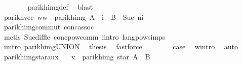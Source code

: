 \begin{isabellebody}
\ \ \ \ \ \ \isamarkupfalse%
\ parikh{\isacharunderscore}{\kern0pt}img{\isacharunderscore}{\kern0pt}def\ \isamarkupfalse%
\ blast\isanewline
\ \ \ \ \isamarkupfalse%
\ \isamarkupfalse%
\ {\isachardoublequoteopen}parikh{\isacharunderscore}{\kern0pt}vec\ {\isacharparenleft}{\kern0pt}w{}{\isacharat}{\kern0pt}w{}{\isacharprime}{\kern0pt}{\isacharparenright}{\kern0pt}\ {\isasymin}\ parikh{\isacharunderscore}{\kern0pt}img\ {\isacharparenleft}{\kern0pt}A\ {\isacharcircum}{\kern0pt}{\isacharcircum}{\kern0pt}\ i\ {\isacharat}{\kern0pt}{\isacharat}{\kern0pt}\ B\ {\isacharcircum}{\kern0pt}{\isacharcircum}{\kern0pt}\ {\isacharparenleft}{\kern0pt}Suc\ n{\isacharminus}{\kern0pt}i{\isacharparenright}{\kern0pt}{\isacharparenright}{\kern0pt}{\isachardoublequoteclose}\isanewline
\ \ \ \ \ \ \isamarkupfalse%
\ parikh{\isacharunderscore}{\kern0pt}img{\isacharunderscore}{\kern0pt}commut\ conc{\isacharunderscore}{\kern0pt}assoc\isanewline
\ \ \ \ \ \ \isamarkupfalse%
\ {\isacharparenleft}{\kern0pt}metis\ Suc{\isacharunderscore}{\kern0pt}diff{\isacharunderscore}{\kern0pt}le\ conc{\isacharunderscore}{\kern0pt}pow{\isacharunderscore}{\kern0pt}comm\ i{\isacharunderscore}{\kern0pt}intro\ lang{\isacharunderscore}{\kern0pt}pow{\isachardot}{\kern0pt}simps{\isacharparenleft}{\kern0pt}{}{\isacharparenright}{\kern0pt}{\isacharparenright}{\kern0pt}\isanewline
\ \ \ \ \isamarkupfalse%
\ i{\isacharunderscore}{\kern0pt}intro\ parikh{\isacharunderscore}{\kern0pt}img{\isacharunderscore}{\kern0pt}UNION\ \isamarkupfalse%
\ {\isacharquery}{\kern0pt}thesis\ \isamarkupfalse%
\ fastforce\isanewline
\ \ \isamarkupfalse%
\isanewline
\ \ \isamarkupfalse%
\ \isamarkupfalse%
\ {\isacharquery}{\kern0pt}case\ \isamarkupfalse%
\ w{\isacharunderscore}{\kern0pt}intro\ \isamarkupfalse%
\ auto\isanewline
{}\isamarkupfalse%
%
\endisatagproof
{\isafoldproof}%
%
\isadelimproof
\isanewline
%
\endisadelimproof
\isanewline
\isanewline
{}\isamarkupfalse%
\ parikh{\isacharunderscore}{\kern0pt}img{\isacharunderscore}{\kern0pt}star{\isacharunderscore}{\kern0pt}aux{}{\isacharcolon}{\kern0pt}\isanewline
\ \ \ {\isachardoublequoteopen}v\ {\isasymin}\ parikh{\isacharunderscore}{\kern0pt}img\ {\isacharparenleft}{\kern0pt}star\ {\isacharparenleft}{\kern0pt}A\ {\isasymunion}\ B{\isacharparenright}{\kern0pt}{\isacharparenright}{\kern0pt}{\isachardoublequoteclose}\isanewline

\end{isabellebody}
